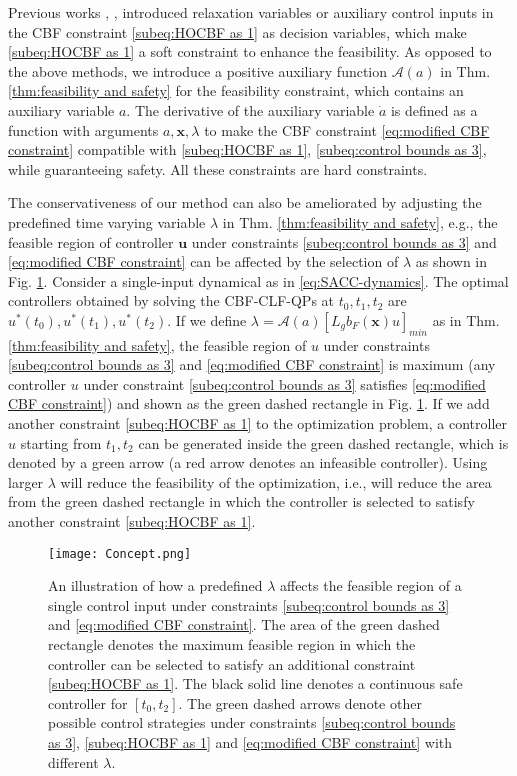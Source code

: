 \documentclass[letterpaper, 10 pt, conference]{ieeeconf}
\theoremstyle{definition}
\begin{document}
 Previous works \cite{zeng2021safety}, \cite{liu2023auxiliary}, \cite{xiao2021adaptive} introduced relaxation variables or auxiliary control inputs in the CBF constraint \eqref{subeq:HOCBF as 1} as decision variables, which make \eqref{subeq:HOCBF as 1} a soft constraint to enhance the feasibility. As opposed to the above methods, we introduce a positive auxiliary function $\mathcal{A}(a)$ in Thm. \ref{thm:feasibility and safety} for the feasibility constraint, which contains an auxiliary variable $a$. The derivative of the auxiliary variable $\dot{a}$ is defined as a function with arguments $a,\boldsymbol{x},\lambda$ to make the CBF constraint \eqref{eq:modified CBF constraint} compatible with \eqref{subeq:HOCBF as 1}, \eqref{subeq:control bounds as 3}, while guaranteeing safety. All these constraints are hard constraints. 
 
 The conservativeness of our method can also be ameliorated by adjusting the predefined time varying variable $\lambda$ in Thm. \ref{thm:feasibility and safety}, e.g., the feasible region of controller $\boldsymbol{u}$ under constraints \eqref{subeq:control bounds as 3} and \eqref{eq:modified CBF constraint} can be affected by the selection of $\lambda$ as shown in Fig. \ref{fig:feasibility region}. Consider a single-input dynamical as in \eqref{eq:SACC-dynamics}. The optimal controllers obtained by solving the CBF-CLF-QPs at $t_{0},t_{1},t_{2}$ are  $u^{\ast}(t_{0}),u^{\ast}(t_{1}),u^{\ast}(t_{2}).$ If we define $\lambda=\mathcal{A}(a)[L_{g}b_{F}(\boldsymbol{x})u]_{min}$ as in Thm. \ref{thm:feasibility and safety}, the feasible region of $u$ under constraints \eqref{subeq:control bounds as 3} and \eqref{eq:modified CBF constraint} is maximum (any controller $u$ under constraint \eqref{subeq:control bounds as 3} satisfies \eqref{eq:modified CBF constraint}) and shown as the green dashed rectangle in Fig. \ref{fig:feasibility region}. If we add another constraint \eqref{subeq:HOCBF as 1} to the  optimization problem, a controller $u$ starting from $t_{1},t_{2}$ can be generated inside the green dashed rectangle, which is denoted by a green arrow (a red arrow denotes an infeasible controller). Using larger $\lambda$ will reduce the feasibility of the optimization, i.e., will reduce the area from the green dashed rectangle in which the controller is selected to satisfy another constraint \eqref{subeq:HOCBF as 1}.
\begin{figure}[ht]
    \centering
    \texttt{[image: Concept.png]}
    \caption{An illustration of how a predefined $\lambda$ affects the feasible region of a single control input under constraints \eqref{subeq:control bounds as 3} and \eqref{eq:modified CBF constraint}. The area of the green dashed rectangle denotes the maximum feasible region in which the controller can be selected to satisfy an additional constraint \eqref{subeq:HOCBF as 1}. The black solid line denotes a continuous safe controller for $[t_{0},t_{2}].$ The green dashed arrows denote other possible control strategies under constraints \eqref{subeq:control bounds as 3}, \eqref{subeq:HOCBF as 1} and \eqref{eq:modified CBF constraint} with different $\lambda.$}
    \label{fig:feasibility region}
\end{figure} 
\end{document}

